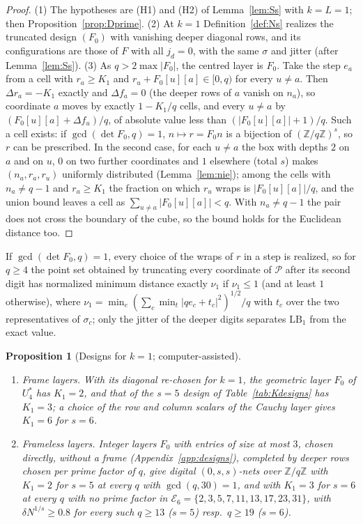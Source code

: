 \documentclass[11pt]{amsart}
\newtheorem{proposition}[theorem]{Proposition}
\theoremstyle{definition}
\theoremstyle{plain}
\newcommand{\Z}{\mathbb{Z}}
\begin{document}
\begin{proof}
(1) The hypotheses are (H1) and (H2) of Lemma~\ref{lem:Ss} with $k=L=1$; then Proposition~\ref{prop:Dprime}. (2) At $k=1$ Definition~\ref{def:Ns} realizes the truncated design $(F_0)$ with vanishing deeper diagonal rows, and its configurations are those of $F$ with all $j_d=0$, with the same $\sigma$ and jitter (after Lemma~\ref{lem:Ss}). (3) As $q>2\max|F_0|$, the centred layer is $F_0$. Take the step $e_a$ from a cell with $r_a\ge K_1$ and $r_u+F_0[u][a]\in[0,q)$ for every $u\ne a$. Then $\Delta r_a=-K_1$ exactly and $\Delta f_a=0$ (the deeper rows of $a$ vanish on $n_a$), so coordinate $a$ moves by exactly $1-K_1/q$ cells, and every $u\ne a$ by $(F_0[u][a]+\Delta f_u)/q$, of absolute value less than $(|F_0[u][a]|+1)/q$. Such a cell exists: if $\gcd(\det F_0,q)=1$, $n\mapsto r=F_0n$ is a bijection of $(\Z/q\Z)^s$, so $r$ can be prescribed. In the second case, for each $u\ne a$ the box with depths $2$ on $a$ and on $u$, $0$ on two further coordinates and $1$ elsewhere (total $s$) makes $(n_a,r_a,r_u)$ uniformly distributed (Lemma~\ref{lem:nie}); among the cells with $n_a\ne q-1$ and $r_a\ge K_1$ the fraction on which $r_u$ wraps is $|F_0[u][a]|/q$, and the union bound leaves a cell as $\sum_{u\ne a}|F_0[u][a]|<q$. With $n_a\ne q-1$ the pair does not cross the boundary of the cube, so the bound holds for the Euclidean distance too.
\end{proof}

If $\gcd(\det F_0,q)=1$, every choice of the wraps of $r$ in a step is realized, so for $q\ge4$ the point set obtained by truncating every coordinate of $\mathcal P$ after its second digit has normalized minimum distance exactly $\nu_1$ if $\nu_1\le1$ (and at least $1$ otherwise), where $\nu_1=\min_e(\sum_c\min_t|qe_c+t_c|^2)^{1/2}/q$ with $t_c$ over the two representatives of $\sigma_c$; only the jitter of the deeper digits separates $\mathrm{LB}_1$ from the exact value.

\begin{proposition}[Designs for $k=1$; computer-assisted]\label{prop:k1designs}
\begin{enumerate}
\item \emph{Frame layers.} With its diagonal re-chosen for $k=1$, the geometric layer $F_0$ of $U^*_4$ has $K_1=2$, and that of the $s=5$ design of Table~\ref{tab:Kdesigns} has $K_1=3$; a choice of the row and column scalars of the Cauchy layer gives $K_1=6$ for $s=6$.
\item \emph{Frameless layers.} Integer layers $F_0$ with entries of size at most $3$, chosen directly, without a frame (Appendix~\ref{app:designs}), completed by deeper rows chosen per prime factor of $q$, give digital $(0,s,s)$-nets over $\Z/q\Z$ with $K_1=2$ for $s=5$ at every $q$ with $\gcd(q,30)=1$, and with $K_1=3$ for $s=6$ at every $q$ with no prime factor in $\mathcal E_6=\{2,3,5,7,11,13,17,23,31\}$, with $\delta N^{1/s}\ge0.8$ for every such $q\ge13$ ($s=5$) resp.\ $q\ge19$ ($s=6$).
\end{enumerate}
\end{proposition}
\end{document}
